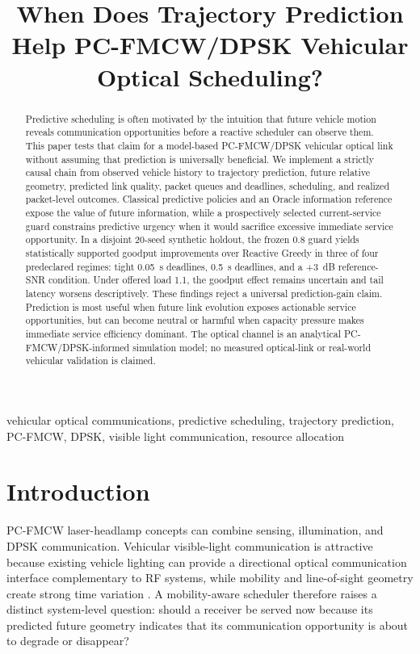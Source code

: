 \documentclass[conference]{IEEEtran}
\title{When Does Trajectory Prediction Help PC-FMCW/DPSK Vehicular Optical Scheduling?}
\author{\IEEEauthorblockN{Author Name}
\IEEEauthorblockA{Affiliation\\
City, Country\\
email@example.com}}
\begin{document}
\maketitle

\begin{abstract}
Predictive scheduling is often motivated by the intuition that future vehicle motion reveals communication opportunities before a reactive scheduler can observe them. This paper tests that claim for a model-based PC-FMCW/DPSK vehicular optical link without assuming that prediction is universally beneficial. We implement a strictly causal chain from observed vehicle history to trajectory prediction, future relative geometry, predicted link quality, packet queues and deadlines, scheduling, and realized packet-level outcomes. Classical predictive policies and an Oracle information reference expose the value of future information, while a prospectively selected current-service guard constrains predictive urgency when it would sacrifice excessive immediate service opportunity. In a disjoint 20-seed synthetic holdout, the frozen 0.8 guard yields statistically supported goodput improvements over Reactive Greedy in three of four predeclared regimes: tight 0.05~s deadlines, 0.5~s deadlines, and a +3~dB reference-SNR condition. Under offered load 1.1, the goodput effect remains uncertain and tail latency worsens descriptively. These findings reject a universal prediction-gain claim. Prediction is most useful when future link evolution exposes actionable service opportunities, but can become neutral or harmful when capacity pressure makes immediate service efficiency dominant. The optical channel is an analytical PC-FMCW/DPSK-informed simulation model; no measured optical-link or real-world vehicular validation is claimed.
\end{abstract}

\begin{IEEEkeywords}
vehicular optical communications, predictive scheduling, trajectory prediction, PC-FMCW, DPSK, visible light communication, resource allocation
\end{IEEEkeywords}

\section{Introduction}
PC-FMCW laser-headlamp concepts can combine sensing, illumination, and DPSK communication. Vehicular visible-light communication is attractive because existing vehicle lighting can provide a directional optical communication interface complementary to RF systems, while mobility and line-of-sight geometry create strong time variation \cite{memedi2021vehicular}. A mobility-aware scheduler therefore raises a distinct system-level question: should a receiver be served now because its predicted future geometry indicates that its communication opportunity is about to degrade or disappear?
\end{document}
